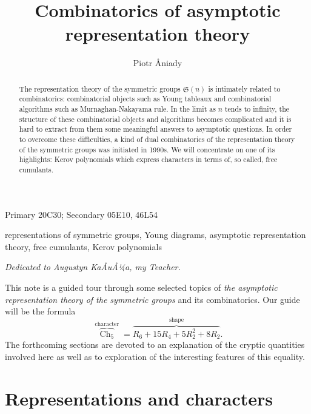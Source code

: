 \documentclass{emsprocart}
\title[Combinatorics of asymptotic representation theory]{Combinatorics of asymptotic representation theory}
\author[Piotr Åniady]{Piotr Åniady}
\theoremstyle{definition}
\begin{document}
\begin{abstract}
The representation theory of the symmetric groups ${\mathfrak{S}({n})}$ is intimately related to combinatorics: combinatorial objects such as Young tableaux and combinatorial algorithms such as Murnaghan-Nakayama rule. In the limit as $n$ tends to infinity, the structure of these combinatorial objects and algorithms becomes complicated and it is hard to extract from them some meaningful answers to asymptotic questions. 
In order to overcome these difficulties, a kind of dual combinatorics of the representation theory of the symmetric groups was initiated in 1990s. We will concentrate on one of its highlights: Kerov polynomials which express characters in terms of, so called, free cumulants. 
\end{abstract}

\begin{classification}
Primary 20C30; 
Secondary 
05E10, 
46L54     
\end{classification}

\begin{keywords}
representations of symmetric groups, Young diagrams, asymptotic representation theory, free cumulants,
Kerov polynomials
\end{keywords}

\maketitle

\vspace{4ex}

\begin{flushright}
\emph{Dedicated to Augustyn KaÅuÅ¼a, my Teacher.}
\end{flushright}

\vspace{1ex}

This note is a guided tour through some selected topics  of \emph{the asymptotic representation theory of the symmetric groups} and its combinatorics. Our guide will be the formula
\begin{equation}
\tag{$\ast$}
\label{eq:main}
 \overbrace{\operatorname{Ch}_5}^{\text{character}} = \overbrace{R_6 + 15R_4 + 5R_2^2 + 8R_2}^{\text{shape}}.
\end{equation}
The forthcoming sections are devoted to an explanation of the cryptic quantities involved here as well as to exploration of the interesting features of this equality.

\section{Representations and characters}
\end{document}
